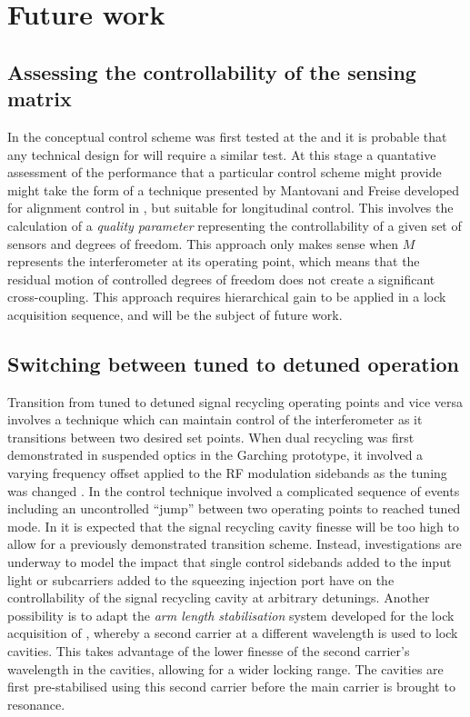 \section{Future work}

\subsection{Assessing the controllability of the sensing matrix}
In \ALIGO{} the conceptual control scheme was first tested at the \CALTECHFORTYM{} and it is probable that any technical design for \ETLF{} will require a similar test. At this stage a quantative assessment of the performance that a particular control scheme might provide might take the form of a technique presented by Mantovani and Freise \cite{Mantovani2008} developed for alignment control in \VIRGO{}, but suitable for longitudinal control. This involves the calculation of a \emph{quality parameter} representing the controllability of a given set of sensors and degrees of freedom. This approach only makes sense when $M$ represents the interferometer at its operating point, which means that the residual motion of controlled degrees of freedom does not create a significant cross-coupling. This approach requires hierarchical gain to be applied in a lock acquisition sequence, and will be the subject of future work.

\subsection{Switching between tuned to detuned operation}
Transition from tuned to detuned signal recycling operating points and vice versa involves a technique which can maintain control of the interferometer as it transitions between two desired set points. When dual recycling was first demonstrated in suspended optics in the Garching prototype, it involved a varying frequency offset applied to the \gls{RF} modulation sidebands as the tuning was changed \cite{Freise2000}. In \GEO{} the control technique involved a complicated sequence of events \cite{Grote2004} including an uncontrolled ``jump'' between two operating points \cite{Hild2007} to reached tuned mode. In \ETLF{} it is expected that the signal recycling cavity finesse will be too high to allow for a previously demonstrated transition scheme. Instead, investigations are underway to model the impact that single control sidebands added to the input light or subcarriers added to the squeezing injection port have on the controllability of the signal recycling cavity at arbitrary detunings. Another possibility is to adapt the \emph{arm length stabilisation} system developed for the lock acquisition of \ALIGO{} \cite{Mullavey2012, Staley2014}, whereby a second carrier at a different wavelength is used to lock cavities. This takes advantage of the lower finesse of the second carrier's wavelength in the cavities, allowing for a wider locking range. The cavities are first pre-stabilised using this second carrier before the main carrier is brought to resonance.

